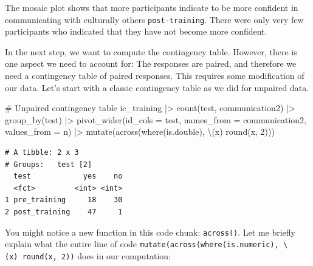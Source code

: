 \documentclass[
  letterpaper,
  DIV=11,
  numbers=noendperiod]{scrreprt}
\newenvironment{Shaded}{\begin{snugshade}}{\end{snugshade}}
\newcommand{\AttributeTok}[1]{\textcolor[rgb]{0.40,0.45,0.13}{#1}}
\newcommand{\CommentTok}[1]{\textcolor[rgb]{0.37,0.37,0.37}{#1}}
\newcommand{\DecValTok}[1]{\textcolor[rgb]{0.68,0.00,0.00}{#1}}
\newcommand{\FunctionTok}[1]{\textcolor[rgb]{0.28,0.35,0.67}{#1}}
\newcommand{\NormalTok}[1]{\textcolor[rgb]{0.00,0.23,0.31}{#1}}
\newcommand{\SpecialCharTok}[1]{\textcolor[rgb]{0.37,0.37,0.37}{#1}}
\begin{document}
The mosaic plot shows that more participants indicate to be more
confident in communicating with culturally others
\texttt{post-training}. There were only very few participants who
indicated that they have not become more confident.

In the next step, we want to compute the contingency table. However,
there is one aspect we need to account for: The responses are paired,
and therefore we need a contingency table of paired responses. This
requires some modification of our data. Let's start with a classic
contingency table as we did for unpaired data.

\begin{Shaded}
\begin{Highlighting}[]
\CommentTok{\# Unpaired contingency table}
\NormalTok{ic\_training }\SpecialCharTok{|\textgreater{}}
  \FunctionTok{count}\NormalTok{(test, communication2) }\SpecialCharTok{|\textgreater{}}
  \FunctionTok{group\_by}\NormalTok{(test) }\SpecialCharTok{|\textgreater{}}
  \FunctionTok{pivot\_wider}\NormalTok{(}\AttributeTok{id\_cols =}\NormalTok{ test,}
              \AttributeTok{names\_from =}\NormalTok{ communication2,}
              \AttributeTok{values\_from =}\NormalTok{ n) }\SpecialCharTok{|\textgreater{}}
  \FunctionTok{mutate}\NormalTok{(}\FunctionTok{across}\NormalTok{(}\FunctionTok{where}\NormalTok{(is.double), \textbackslash{}(x) }\FunctionTok{round}\NormalTok{(x, }\DecValTok{2}\NormalTok{)))}
\end{Highlighting}
\end{Shaded}

\begin{verbatim}
# A tibble: 2 x 3
# Groups:   test [2]
  test            yes    no
  <fct>         <int> <int>
1 pre_training     18    30
2 post_training    47     1
\end{verbatim}

You might notice a new function in this code chunk: \texttt{across()}.
Let me briefly explain what the entire line of code
\texttt{mutate(across(where(is.numeric),\ \textbackslash{}(x)\ round(x,\ 2))}
does in our computation:
\end{document}
